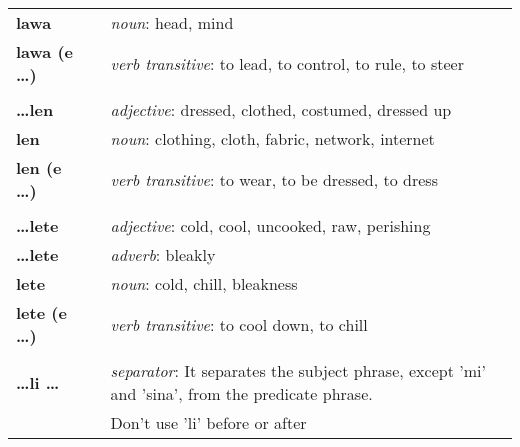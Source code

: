 \begin{supertabular}{p{2,5cm}|ll}
    \textbf{lawa}                &  & \textit{noun}: head, mind                                                                                  \\
    \textbf{lawa (e \dots)}      &  & \textit{verb transitive}: to lead, to control, to rule, to steer                                           \\
                                 &  &                                                                                                            \\
    \textbf{\dots len}           &  & \textit{adjective}: dressed, clothed, costumed, dressed up                                                 \\
    \textbf{len}                 &  & \textit{noun}: clothing, cloth, fabric, network, internet                                                  \\
    \textbf{len (e \dots)}       &  & \textit{verb transitive}: to wear, to be dressed, to dress                                                 \\
                                 &  &                                                                                                            \\
    \textbf{\dots lete}          &  & \textit{adjective}: cold, cool, uncooked, raw, perishing                                                   \\
    \textbf{\dots lete}          &  & \textit{adverb}: bleakly                                                                                   \\
    \textbf{lete}                &  & \textit{noun}: cold, chill, bleakness                                                                      \\
    \textbf{lete (e \dots)}      &  & \textit{verb transitive}: to cool down, to chill                                                           \\
                                 &  &                                                                                                            \\
    \textbf{\dots li \dots}      &  & \textit{separator}: It separates the subject phrase, except 'mi' and 'sina', from the predicate phrase.    \\
                                 &  & Don't use 'li' before or after                                                                             \\

\end{supertabular}
